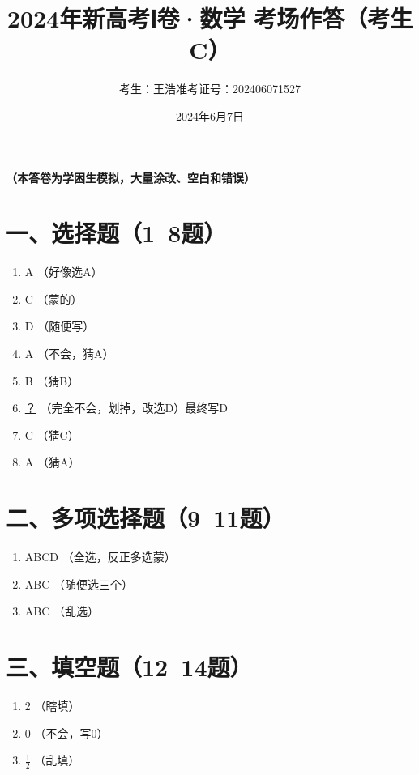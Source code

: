 \documentclass[12pt,a4paper]{article}
\title{2024年新高考Ⅰ卷·数学 考场作答（考生C）}
\author{考生：王浩\quad 准考证号：202406071527}
\date{2024年6月7日}
\begin{document}
\maketitle
\begin{center}
{\large \textbf{（本答卷为学困生模拟，大量涂改、空白和错误）}}
\end{center}

\section*{一、选择题（1~8题）}
\begin{enumerate}[label=\arabic*.]
\item A \quad （好像选A）
\item C \quad （蒙的）
\item D \quad （随便写）
\item A \quad （不会，猜A）
\item B \quad （猜B）
\item \underline{？} \quad （完全不会，划掉，改选D）\quad 最终写D
\item C \quad （猜C）
\item A \quad （猜A）
\end{enumerate}

\section*{二、多项选择题（9~11题）}
\begin{enumerate}[label=\arabic*.]
\item ABCD \quad （全选，反正多选蒙）
\item ABC \quad （随便选三个）
\item ABC \quad （乱选）
\end{enumerate}

\section*{三、填空题（12~14题）}
\begin{enumerate}[label=\arabic*.]
\item 2 \quad （瞎填）
\item 0 \quad （不会，写0）
\item $\frac12$ \quad （乱填）
\end{enumerate}
\end{document}
